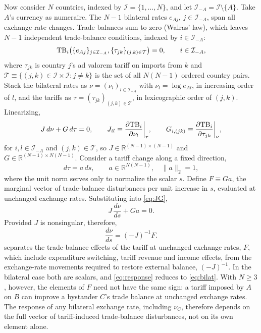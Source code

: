 Now consider $N$ countries, indexed by $\mathcal I=\{1,\dots,N\}$, and let $\mathcal I_{-A}=\mathcal I\setminus\{A\}$. Take $A$'s currency as numeraire. The $N-1$ bilateral rates $e_{Aj}$, $j\in\mathcal I_{-A}$, span all exchange-rate changes. Trade balances sum to zero (Walras' law), which leaves $N-1$ independent trade-balance conditions, indexed by $i\in\mathcal I_{-A}$:
\begin{equation*}
\mathrm{TB}_i\big(\{e_{Aj}\}_{j\in\mathcal I_{-A}},\{\tau_{jk}\}_{(j,k)\in\mathcal T}\big)=0,\qquad i\in\mathcal I_{-A},
\end{equation*}
where $\tau_{jk}$ is country $j$'s ad valorem tariff on imports from $k$ and $\mathcal T\equiv\{(j,k)\in\mathcal I\times\mathcal I:j\neq k\}$ is the set of all $N(N-1)$ ordered country pairs. Stack the bilateral rates as $\nu=(\nu_l)_{l\in\mathcal I_{-A}}$ with $\nu_l=\log e_{Al}$, in increasing order of $l$, and the tariffs as $\tau=(\tau_{jk})_{(j,k)\in\mathcal T}$, in lexicographic order of $(j,k)$. Linearizing,
\begin{equation}
J\,d\nu+G\,d\tau=0,\qquad J_{il}\equiv\frac{\partial\mathrm{TB}_i}{\partial\nu_l}\bigg|_{\tau},\qquad G_{i,(jk)}\equiv\frac{\partial\mathrm{TB}_i}{\partial\tau_{jk}}\bigg|_{\nu},
\label{eq:JG}
\end{equation}
for $i,l\in\mathcal I_{-A}$ and $(j,k)\in\mathcal T$, so $J\in\mathbb R^{(N-1)\times(N-1)}$ and $G\in\mathbb R^{(N-1)\times N(N-1)}$. Consider a tariff change along a fixed direction,
\begin{equation*}
d\tau=a\,ds,\qquad a\in\mathbb R^{N(N-1)},\quad\|a\|_2=1,
\end{equation*}
where the unit norm serves only to normalize the scalar $s$. Define $F\equiv Ga$, the marginal vector of trade-balance disturbances per unit increase in $s$, evaluated at unchanged exchange rates. Substituting into \cref{eq:JG},
\begin{equation*}
J\,\frac{d\nu}{ds}+Ga=0.
\end{equation*}
Provided $J$ is nonsingular, therefore,
\begin{equation}
\boxed{\;\frac{d\nu}{ds}=(-J)^{-1}F.\;}
\label{eq:response}
\end{equation}
 separates the trade-balance effects of the tariff at unchanged exchange rates, $F$, which include expenditure switching, tariff revenue and income effects, from the exchange-rate movements required to restore external balance, $(-J)^{-1}$. In the bilateral case both are scalars, and \cref{eq:response} reduces to \cref{eq:bilat}. With $N\geq3$, however, the elements of $F$ need not have the same sign: a tariff imposed by $A$ on $B$ can improve a bystander $C$'s trade balance at unchanged exchange rates. The response of any bilateral exchange rate, including $\nu_C$, therefore depends on the full vector of tariff-induced trade-balance disturbances, not on its own element alone.

